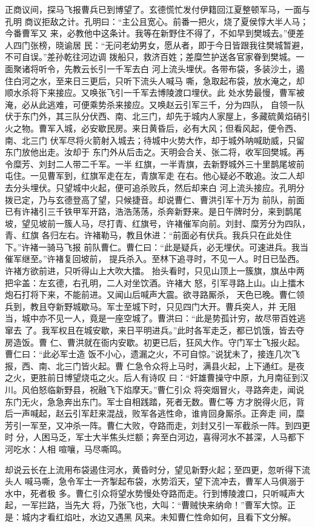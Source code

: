 正商议间，探马飞报曹兵已到博望了。玄德慌忙发付伊籍回江夏整顿军马，一面与孔明
商议拒敌之计。孔明曰：“主公且宽心。前番一把火，烧了夏侯惇大半人马；今番曹军又
来，必教他中这条计。我等在新野住不得了，不如早到樊城去。”便差人四门张榜，晓谕居
民：“无问老幼男女，愿从者，即于今日皆跟我往樊城暂避，不可自误。”差孙乾往河边调
拨船只，救济百姓；差糜竺护送各官家眷到樊城。一面聚诸将听令，先教云长引一千军去白
河上流头埋伏。各带布袋，多装沙土，遏住白河之水，至来日三更后，只听下流头人喊马
嘶，急取起布袋，放水淹之，却顺水杀将下来接应。又唤张飞引一千军去博陵渡口埋伏。此
处水势最慢，曹军被淹，必从此逃难，可便乘势杀来接应。又唤赵云引军三千，分为四队，
自领一队伏于东门外，其三队分伏西、南、北三门，却先于城内人家屋上，多藏硫黄焰硝引
火之物。曹军入城，必安歇民房。来日黄昏后，必有大风；但看风起，便令西、南、北三门
伏军尽将火箭射入城去；待城中火势大作，却于城外呐喊助威，只留东门放他出走。汝却于
东门外从后击之。天明会合关、张二将，收军回樊城。再令糜芳、刘封二人带二千军。一半
红旗，一半青旗，去新野城外三十里鹊尾坡前屯住。一见曹军到，红旗军走在左，青旗军走
在右。他心疑必不敢追。汝二人却去分头埋伏。只望城中火起，便可追杀败兵，然后却来白
河上流头接应。孔明分拨已定，乃与玄德登高了望，只候捷音。却说曹仁、曹洪引军十万为
前队，前面已有许褚引三千铁甲军开路，浩浩荡荡，杀奔新野来。是日午牌时分，来到鹊尾
坡，望见坡前一簇人马，尽打青、红旗号，许褚催军向前。刘封、糜芳分为四队，青、红旗
各归左右。许褚勒马，教且休进：“前面必有伏兵。我兵只在此处住下。”许褚一骑马飞报
前队曹仁。曹仁曰：“此是疑兵，必无埋伏。可速进兵。我当催军继至。”许褚复回坡前，
提兵杀入。至林下追寻时，不见一人。时日已坠西。许褚方欲前进，只听得山上大吹大擂。
抬头看时，只见山顶上一簇旗，旗丛中两把伞盖：左玄德，右孔明，二人对坐饮酒。许褚大
怒，引军寻路上山。山上擂木炮石打将下来，不能前进。又闻山后喊声大震。欲寻路厮杀，
天色已晚。曹仁领兵到，教且夺新野城歇马。军士至城下时，只见四门大开。曹兵突人，并
无阻当，城中亦不见一人，竟是一座空城了。曹洪曰：“此是势孤计穷，故尽带百姓逃窜去
了。我军权且在城安歇，来日平明进兵。”此时各军走乏，都已饥饿，皆去夺房造饭。曹
仁、曹洪就在衙内安歇。初更已后，狂风大作。守门军士飞报火起。曹仁曰：“此必军士造
饭不小心，遗漏之火，不可自惊。”说犹未了，接连几次飞报，西、南、北三门皆火起。曹
仁急令众将上马时，满县火起，上下通红。是夜之火，更胜前日博望烧屯之火。后人有诗叹
曰：“奸雄曹操守中原，九月南征到汉川。风伯怒临新野县，祝融飞下焰摩天。”曹仁引众
将突烟冒火，寻路奔走，闻说东门无火，急急奔出东门。军士自相践踏，死者无数。曹仁等
方才脱得火厄，背后一声喊起，赵云引军赶来混战，败军各逃性命，谁肯回身厮杀。正奔走
间，糜芳引一军至，又冲杀一阵。曹仁大败，夺路而走，刘封又引一军截杀一阵。到四更时
分，人困马乏，军士大半焦头烂额；奔至白河边，喜得河水不甚深，人马都下河吃水：人相
喧嚷，马尽嘶鸣。

却说云长在上流用布袋遏住河水，黄昏时分，望见新野火起；至四更，忽听得下流头人
喊马嘶，急令军士一齐掣起布袋，水势滔天，望下流冲去，曹军人马俱溺于水中，死者极
多。曹仁引众将望水势慢处夺路而走。行到博陵渡口，只听喊声大起，一军拦路，当先大
将，乃张飞也，大叫：“曹贼快来纳命！”曹军大惊。正是：城内才看红焰吐，水边又遇黑
风来。未知曹仁性命如何，且看下文分解。
